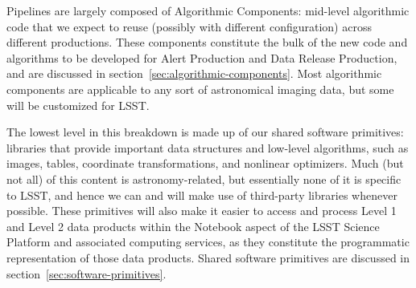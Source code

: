 Pipelines are largely composed of Algorithmic Components: mid-level algorithmic code that we expect to reuse (possibly with different configuration) across different productions.  These components constitute the bulk of the new code and algorithms to be developed for Alert Production and Data Release Production, and are discussed in section~\ref{sec:algorithmic-components}.  Most algorithmic components are applicable to any sort of astronomical imaging data, but some will be customized for LSST.

The lowest level in this breakdown is made up of our shared software primitives: libraries that provide important data structures and low-level algorithms, such as images, tables, coordinate transformations, and nonlinear optimizers.  Much (but not all) of this content is astronomy-related, but essentially none of it is specific to LSST, and hence we can and will make use of third-party libraries whenever possible.  These primitives will also make it easier to access and process Level 1 and Level 2 data products within the Notebook aspect of the LSST Science Platform and associated computing services, as they constitute the programmatic representation of those data products.  Shared software primitives are discussed in section~\ref{sec:software-primitives}.
